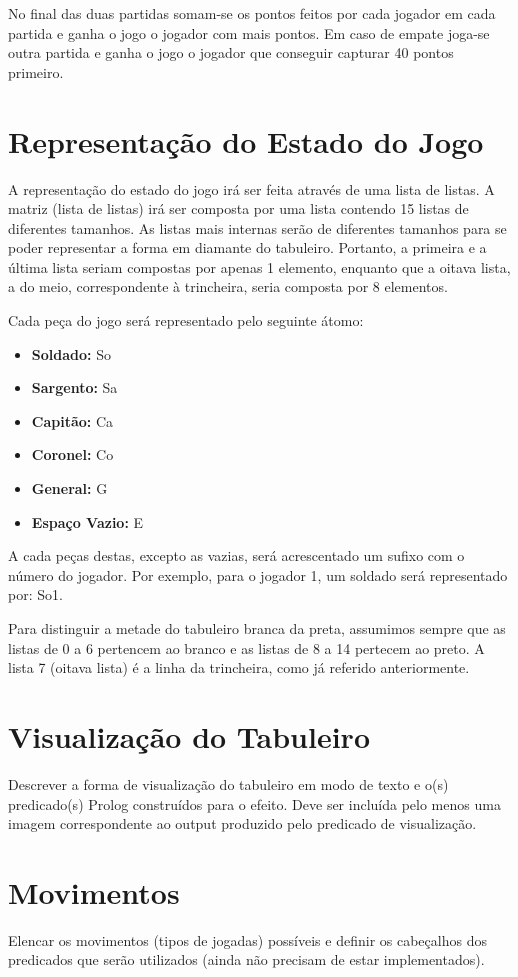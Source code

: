 \documentclass[a4paper]{article}
\begin{document}
No final das duas partidas somam-se os pontos feitos por cada jogador em cada partida e ganha o jogo o jogador com mais pontos. Em caso de empate joga-se outra partida e ganha o jogo o jogador que conseguir capturar 40 pontos primeiro. 

\newpage



\section{Representação do Estado do Jogo}

A representação do estado do jogo irá ser feita através de uma lista de listas. 
A matriz (lista de listas) irá ser composta por uma lista contendo 15 listas de diferentes tamanhos. As listas mais internas serão de diferentes tamanhos para se poder representar a forma em diamante do tabuleiro. Portanto, a primeira e a última lista seriam compostas por apenas 1 elemento, enquanto que a oitava lista, a do meio, correspondente à trincheira, seria composta por 8 elementos. 

Cada peça do jogo será representado pelo seguinte átomo: 

\begin{itemize}
	\item{\textbf{Soldado:} So}
	\item {\textbf{Sargento:} Sa}
	\item{\textbf{Capitão:} Ca}
	\item{\textbf{Coronel:} Co}
	\item{\textbf{General:} G}
	\item{\textbf{Espaço Vazio:} E}
\end{itemize}

A cada peças destas, excepto as vazias, será acrescentado um sufixo com o número do jogador. Por exemplo, para o jogador 1, um soldado será representado por: So1.

Para distinguir a metade do tabuleiro branca da preta, assumimos sempre que as listas de 0 a 6 pertencem ao branco e as listas de 8 a 14 pertecem ao preto. A lista 7 (oitava lista) é a linha da trincheira, como já referido anteriormente. 


\section{Visualização do Tabuleiro}

Descrever a forma de visualização do tabuleiro em modo de texto e o(s) predicado(s) Prolog construídos para o efeito.
Deve ser incluída pelo menos uma imagem correspondente ao output produzido pelo predicado de visualização.


\section{Movimentos}

Elencar os movimentos (tipos de jogadas) possíveis e definir os cabeçalhos dos predicados que serão utilizados (ainda não precisam de estar implementados).
\end{document}
